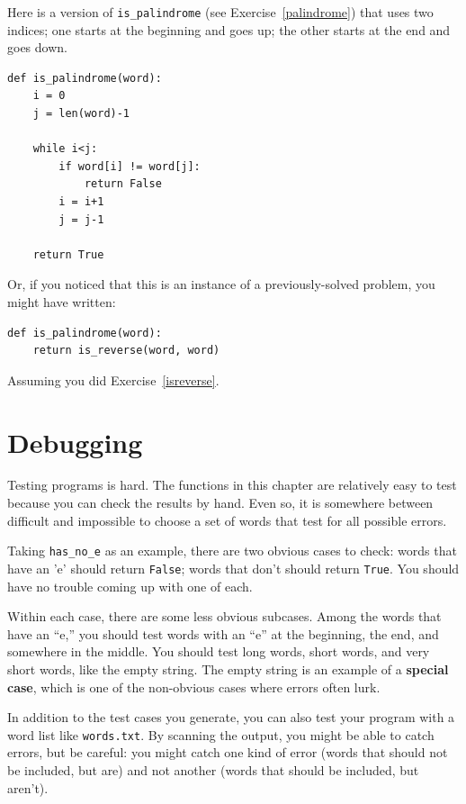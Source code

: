 \documentclass[10pt]{book}
\begin{document}
\begin{CJK}{UTF8}{gbsn}
Here is a version of \verb"is_palindrome" (see
Exercise~\ref{palindrome}) that uses two indices; one starts at the
beginning and goes up; the other starts at the end and goes down.

\begin{verbatim}
def is_palindrome(word):
    i = 0
    j = len(word)-1

    while i<j:
        if word[i] != word[j]:
            return False
        i = i+1
        j = j-1

    return True
\end{verbatim}

Or, if you noticed that this is an instance of a previously-solved
problem, you might have written:

\begin{verbatim}
def is_palindrome(word):
    return is_reverse(word, word)
\end{verbatim}

Assuming you did Exercise~\ref{isreverse}.


\section{Debugging}

Testing programs is hard.  The functions in this chapter are
relatively easy to test because you can check the results by hand.
Even so, it is somewhere between difficult and impossible to choose a
set of words that test for all possible errors.

Taking \verb"has_no_e" as an example, there are two obvious
cases to check: words that have an 'e' should return {\tt False};
words that don't should return {\tt True}.  You should have no
trouble coming up with one of each.

Within each case, there are some less obvious subcases.  Among the
words that have an ``e,'' you should test words with an ``e'' at the
beginning, the end, and somewhere in the middle.  You should test long
words, short words, and very short words, like the empty string.  The
empty string is an example of a {\bf special case}, which is one of
the non-obvious cases where errors often lurk.

In addition to the test cases you generate, you can also test
your program with a word list like {\tt words.txt}.  By scanning
the output, you might be able to catch errors, but be careful:
you might catch one kind of error (words that should not be
included, but are) and not another (words that should be included,
but aren't).


\end{CJK}
\end{document}

